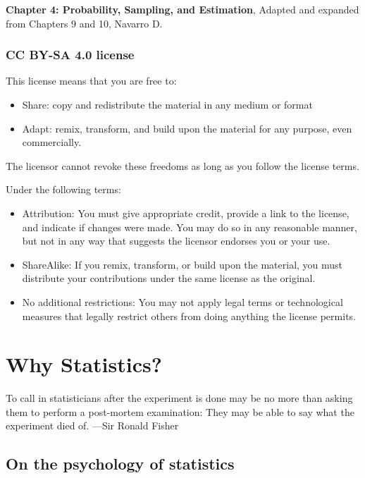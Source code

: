 \documentclass[
]{book}
\providecommand{\tightlist}{%
  \setlength{\itemsep}{0pt}\setlength{\parskip}{0pt}}
\begin{document}
\textbf{Chapter 4: Probability, Sampling, and Estimation}, Adapted and expanded from Chapters 9 and 10, Navarro D.

\hypertarget{cc-by-sa-4.0-license}{%
\subsection{CC BY-SA 4.0 license}\label{cc-by-sa-4.0-license}}

This license means that you are free to:

\begin{itemize}
\tightlist
\item
  Share: copy and redistribute the material in any medium or format
\item
  Adapt: remix, transform, and build upon the material for any purpose, even commercially.
\end{itemize}

The licensor cannot revoke these freedoms as long as you follow the license terms.

Under the following terms:

\begin{itemize}
\tightlist
\item
  Attribution: You must give appropriate credit, provide a link to the license, and indicate if changes were made. You may do so in any reasonable manner, but not in any way that suggests the licensor endorses you or your use.
\item
  ShareAlike: If you remix, transform, or build upon the material, you must distribute your contributions under the same license as the original.
\item
  No additional restrictions: You may not apply legal terms or technological measures that legally restrict others from doing anything the license permits.
\end{itemize}

\hypertarget{why-statistics}{%
\chapter{Why Statistics?}\label{why-statistics}}

{
To call in statisticians after the experiment is done may be no more than asking them to perform a post-mortem examination: They may be able to say what the experiment died of.
---Sir Ronald Fisher
}

\hypertarget{on-the-psychology-of-statistics}{%
\section{On the psychology of statistics}\label{on-the-psychology-of-statistics}}
\end{document}
